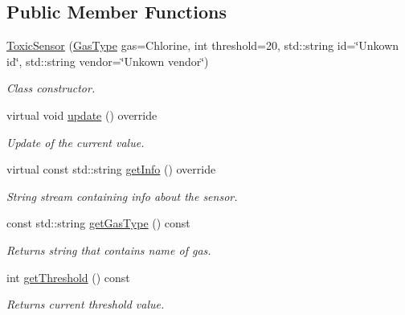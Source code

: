 \subsection*{Public Member Functions}
\begin{DoxyCompactItemize}
\item 
\hyperlink{classToxicSensor_a3d1f5f90e0561127e8ee3e5ee79c6473}{Toxic\+Sensor} (\hyperlink{classToxicSensor_a140f14965ad9a7e71fc8a5a2ed2c919b}{Gas\+Type} gas=Chlorine, int threshold=20, std\+::string id=\char`\"{}Unkown id\char`\"{}, std\+::string vendor=\char`\"{}Unkown vendor\char`\"{})
\begin{DoxyCompactList}\small\item\em Class constructor. \end{DoxyCompactList}\item 
virtual void \hyperlink{classToxicSensor_ae4c58761cf2ef02e1d782f7f13cc56ff}{update} () override
\begin{DoxyCompactList}\small\item\em Update of the current value. \end{DoxyCompactList}\item 
virtual const std\+::string \hyperlink{classToxicSensor_abd9e11dc07b3456915ca261dc61071ac}{get\+Info} () override\hypertarget{classToxicSensor_abd9e11dc07b3456915ca261dc61071ac}{}\label{classToxicSensor_abd9e11dc07b3456915ca261dc61071ac}

\begin{DoxyCompactList}\small\item\em String stream containing info about the sensor. \end{DoxyCompactList}\item 
const std\+::string \hyperlink{classToxicSensor_a1f49ce67d6f7d871249b7d817940f6b8}{get\+Gas\+Type} () const \hypertarget{classToxicSensor_a1f49ce67d6f7d871249b7d817940f6b8}{}\label{classToxicSensor_a1f49ce67d6f7d871249b7d817940f6b8}

\begin{DoxyCompactList}\small\item\em Returns string that contains name of gas. \end{DoxyCompactList}\item 
int \hyperlink{classToxicSensor_a4a0ec4b0440b8c8b3cdbb703277cf87c}{get\+Threshold} () const \hypertarget{classToxicSensor_a4a0ec4b0440b8c8b3cdbb703277cf87c}{}\label{classToxicSensor_a4a0ec4b0440b8c8b3cdbb703277cf87c}

\begin{DoxyCompactList}\small\item\em Returns current threshold value. \end{DoxyCompactList}\end{DoxyCompactItemize}
